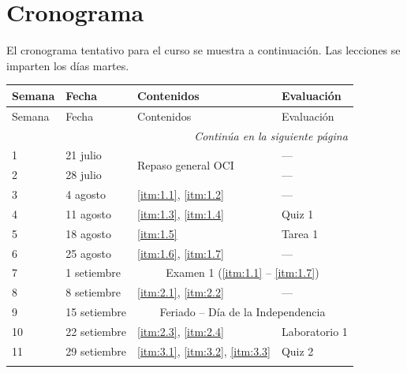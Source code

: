 \section{Cronograma}

El cronograma tentativo para el curso se muestra a continuación. Las lecciones se imparten los días martes.

\begin{longtable}{p{1.2cm}p{3.2cm}p{4.5cm}p{2.8cm}}
\toprule
Semana & Fecha & Contenidos & Evaluación \\
\midrule
\endfirsthead

\toprule
Semana & Fecha & Contenidos & Evaluación \\
\midrule
\endhead

\midrule
\multicolumn{4}{r}{\textit{Continúa en la siguiente página}} \\
\endfoot

\bottomrule
\endlastfoot

1 &
21 julio &
  \multirow{2}{*}{Repaso general OCI}
&
---
\\
\addlinespace

2 &
28 julio &
&
---
\\
\addlinespace

3 &
4 agosto &
\ref{itm:1.1}, \ref{itm:1.2}
&
---
\\
\addlinespace

4 &
11 agosto &
\ref{itm:1.3}, \ref{itm:1.4}
&
Quiz 1
\\
\addlinespace

5 &
18 agosto &
\ref{itm:1.5}
&
Tarea 1
\\
\addlinespace

6 &
25 agosto &
\ref{itm:1.6}, \ref{itm:1.7}
&
---
\\
\addlinespace

\rowcolor{yellow!20}
7 &
1 setiembre &
\multicolumn{2}{c}{Examen 1 (\ref{itm:1.1} -- \ref{itm:1.7})}
\\
\addlinespace

8 &
8 setiembre &
\ref{itm:2.1}, \ref{itm:2.2}
&
---
\\
\addlinespace

9 &
15 setiembre &
\multicolumn{2}{c}{Feriado -- Día de la Independencia}
\\
\addlinespace

10 &
22 setiembre &
\ref{itm:2.3}, \ref{itm:2.4}
&
Laboratorio 1
\\
\addlinespace

11 &
29 setiembre &
\ref{itm:3.1}, \ref{itm:3.2}, \ref{itm:3.3}
&
Quiz 2
\\
\addlinespace


\end{longtable}
